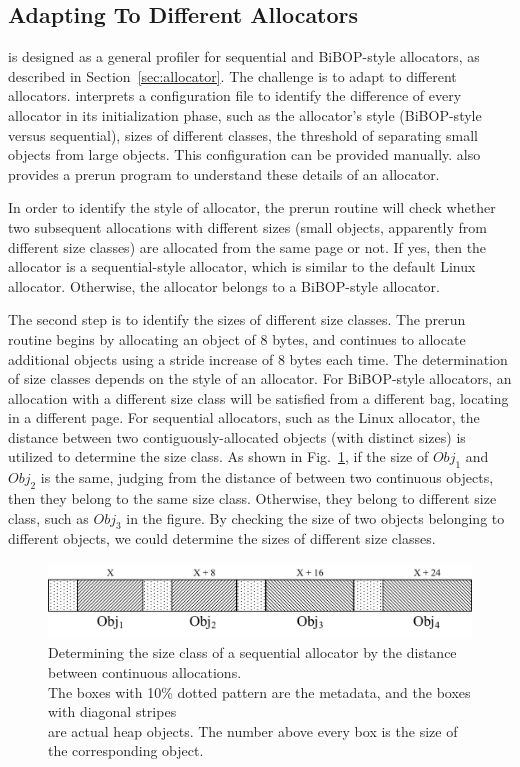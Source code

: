 \subsection{Adapting To Different Allocators}
\label{sec:understandingallocators}

\MP{} is designed as a general profiler for sequential and BiBOP-style allocators, as described in Section~\ref{sec:allocator}. The challenge is to adapt  to different allocators. \MP{} interprets a configuration file to identify the difference of every allocator in its initialization phase, such as the allocator's style (BiBOP-style versus sequential), sizes of different classes, the threshold of separating small objects from large objects. This configuration can be provided manually. \MP{} also provides a prerun program to understand these details of an allocator. 

In order to identify the style of allocator, the prerun routine will check whether two subsequent allocations with different sizes (small objects, apparently from different size classes) are allocated from the same page or not. If yes, then the allocator is a sequential-style allocator, which is similar to the default Linux allocator. Otherwise, the allocator belongs to a BiBOP-style allocator. 

The second step is to identify the sizes of different size classes. The prerun routine begins by allocating an object of 8 bytes, and continues to allocate additional objects using a stride increase of 8 bytes each time. The determination of size classes depends on the style of an allocator. For BiBOP-style allocators, an allocation with a different size class will be satisfied from a different bag, locating in a different page. For sequential allocators, such as the Linux allocator, the distance between two contiguously-allocated objects (with distinct sizes) is utilized to determine the size class. As shown in Fig.~\ref{fig:sizeclass}, if the size of $Obj_1$ and $Obj_2$ is the same, judging from the distance of between two continuous objects, then they belong to the same size class. Otherwise, they belong to different size class, such as $Obj_3$ in the figure. By checking the size of two objects belonging to different objects, we could determine the sizes of different size classes.  

\begin{figure}[!ht]
\centering
\includegraphics[width=5in]{figures/sequentialclasssize}
\caption{Determining the size class of a sequential allocator by the distance between continuous allocations. \\The boxes with 10\% dotted pattern are the metadata, and the boxes with diagonal stripes\\ are actual heap objects. The number above every box is the size of the corresponding object. \label{fig:sizeclass}}
\end{figure}


